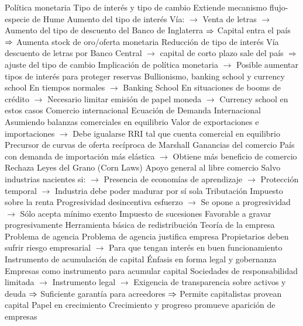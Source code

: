 \documentclass{nuevotema}
\begin{document}
\begin{esquemal}
		\2 Política monetaria
			\3 Tipo de interés y tipo de cambio
				\4 Extiende mecanismo flujo-especie de Hume
				\4 Aumento del tipo de interés
				\4[] Vía:
				\4[] $\to$ Venta de letras
				\4[] $\to$ Aumento del tipo de descuento del Banco de Inglaterra
				\4[] $\Rightarrow$ Capital entra el país
				\4[] $\Rightarrow$ Aumenta stock de oro/oferta monetaria
				\4 Reducción de tipo de interés
				\4[] Vía descuento de letras por Banco Central
				\4[] $\to$ capital de corto plazo sale del país
				\4[] $\Rightarrow$ ajuste del tipo de cambio
				\4 Implicación de política monetaria
				\4[] $\to$ Posible aumentar tipos de interés para proteger reservas
			\3 Bullionismo, banking school y currency school
				\4 En tiempos normales
				\4[] $\to$ Banking School
				\4 En situaciones de booms de crédito
				\4[] $\to$ Necesario limitar emisión de papel moneda
				\4[] $\to$ Currency school en estos casos
		\2 Comercio internacional
			\3 Ecuación de Demanda Internacional
				\4 Asumiendo balanzas comerciales en equilibrio
				\4 Valor de exportaciones e importaciones
				\4[] $\to$ Debe igualarse
				\4[$\Rightarrow$] RRI tal que cuenta comercial en equilibrio
				\4 Precursor de curvas de oferta recíproca de Marshall
			\3 Ganancias del comercio
				\4 País con demanda de importación más elástica
				\4[] $\to$ Obtiene más beneficio de comercio
				\4 Rechaza Leyes del Grano (Corn Laws)
				\4 Apoyo general al libre comercio
				\4 Salvo industrias nacientes si:
				\4[] $\to$ Presencia de economías de aprendizaje
				\4[] $\to$ Protección temporal
				\4[] $\to$ Industria debe poder madurar por sí sola
		\2 Tributación
			\3 Impuesto sobre la renta
				\4 Progresividad desincentiva esfuerzo
				\4[] $\to$ Se opone a progresividad
				\4[] $\to$ Sólo acepta mínimo exento
			\3 Impuesto de sucesiones
				\4 Favorable a gravar progresivamente
				\4 Herramienta básica de redistribución
		\2 Teoría de la empresa
			\3 Problema de agencia
				\4 Problema de agencia justifica empresa
				\4[] Propietarios deben sufrir riesgo empresarial
				\4[] $\to$ Para que tengan interés en buen funcionamiento
			\3 Instrumento de acumulación de capital
				\4 Énfasis en forma legal y gobernanza
				\4 Empresas como instrumento para acumular capital
				\4[] Sociedades de responsabilidad limitada
				\4[] $\to$ Instrumento legal
				\4[] $\to$ Exigencia de transparencia sobre activos y deuda
				\4[] $\Rightarrow$ Suficiente garantía para acreedores
				\4[] $\Rightarrow$ Permite capitalistas provean capital
			\3 Papel en crecimiento
				\4 Crecimiento y progreso promueve aparición de empresas

\end{esquemal}
\end{document}
